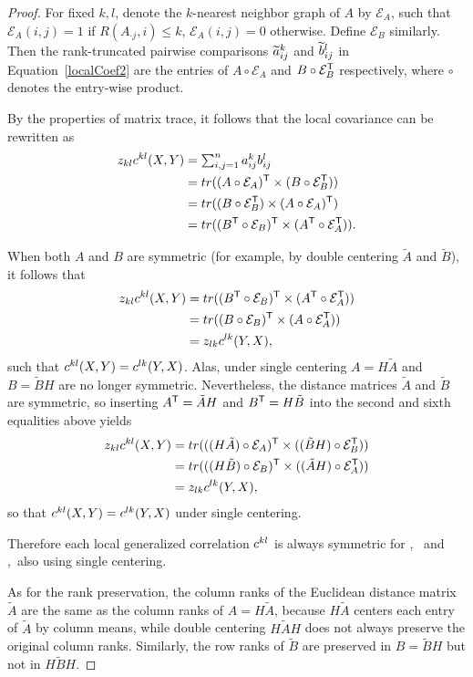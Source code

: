 \documentclass[11pt]{article}
\begin{document}
\begin{proof}
For fixed $k,l$, denote the $k$-nearest neighbor graph of $A$ by $\mathcal{E}_{A}$,
such that $\mathcal{E}_{A}(i,j)=1$ if $R(A_{\cdot j},i) \leq k$,
$\mathcal{E}_{A}(i,j)=0$ otherwise. Define $\mathcal{E}_{B}$ similarly. Then the rank-truncated pairwise comparisons $\widetilde{a}_{ij}^k$ and $\widetilde{b}_{ij}^l$ in Equation~\ref{localCoef2} are the entries of $A \circ \mathcal{E}_{A}$ and $B \circ \mathcal{E}_{B}^{\mathsf{T}}$ respectively, where $\circ$ denotes the entry-wise product.

By the properties of matrix trace, it follows that the local covariance can be rewritten as
\begin{align*}
z_{kl} c^{kl}(X,Y) &= \textstyle \sum_{i,j=1}^n a_{ij}^k b_{ij}^l \\
 &= tr((A \circ \mathcal{E}_{A})^{\mathsf{T}} \times (B \circ \mathcal{E}_{B}^{\mathsf{T}})) \\
 &= tr((B \circ \mathcal{E}_{B}^{\mathsf{T}}) \times (A \circ \mathcal{E}_{A})^{\mathsf{T}}) \\
 &= tr((B^{\mathsf{T}} \circ \mathcal{E}_{B})^{\mathsf{T}} \times (A^{\mathsf{T}} \circ \mathcal{E}_{A}^{\mathsf{T}})).
\end{align*}

When both $A$ and $B$ are symmetric (for example, by double centering $\tilde{A}$ and $\tilde{B}$), it follows that
\begin{align*}
z_{kl} c^{kl}(X,Y) &= tr((B^{\mathsf{T}} \circ \mathcal{E}_{B})^{\mathsf{T}} \times (A^{\mathsf{T}} \circ \mathcal{E}_{A}^{\mathsf{T}})) \\
 &= tr((B \circ \mathcal{E}_{B})^{\mathsf{T}} \times (A \circ \mathcal{E}_{A}^{\mathsf{T}})) \\
 &= z_{lk} c^{lk}(Y,X),
\end{align*}
such that $c^{kl}(X,Y)=c^{lk}(Y,X)$.
% 
Alas, under single centering $A=H \tilde{A}$ and $B=\tilde{B}H$ are no longer symmetric. Nevertheless, the distance matrices $\tilde{A}$ and $\tilde{B}$ are symmetric, so inserting $A^{\mathsf{T}}=\tilde{A}H$ and $B^{\mathsf{T}}=H\tilde{B}$ into the second and sixth equalities above yields
\begin{align*}
z_{kl} c^{kl}(X,Y) &= tr(((H \tilde{A}) \circ \mathcal{E}_{A})^{\mathsf{T}} \times ((\tilde{B}H) \circ \mathcal{E}_{B}^{\mathsf{T}})) \\
 &= tr(((H \tilde{B}) \circ \mathcal{E}_{B})^{\mathsf{T}} \times ((\tilde{A}H) \circ \mathcal{E}_{A}^{\mathsf{T}})) \\
 &= z_{lk} c^{lk}(Y,X),
\end{align*}
so that $c^{kl}(X,Y)=c^{lk}(Y,X)$ under single centering.

Therefore each local generalized correlation $c^{kl}$ is always symmetric for \Mantel, \Dcorr~and \Mcorr,~also using single centering.

As for the rank preservation, the column ranks of the Euclidean distance matrix $\tilde{A}$ are the same as the column ranks of $A=H \tilde{A}$, because $H \tilde{A}$ centers each entry of $\tilde{A}$ by column means, while double centering $H \tilde{A} H$ does not always preserve the original column ranks. Similarly, the row ranks of $\tilde{B}$ are preserved in $B=\tilde{B}H$ but not in $H \tilde{B} H$. 
\end{proof}
\end{document}
